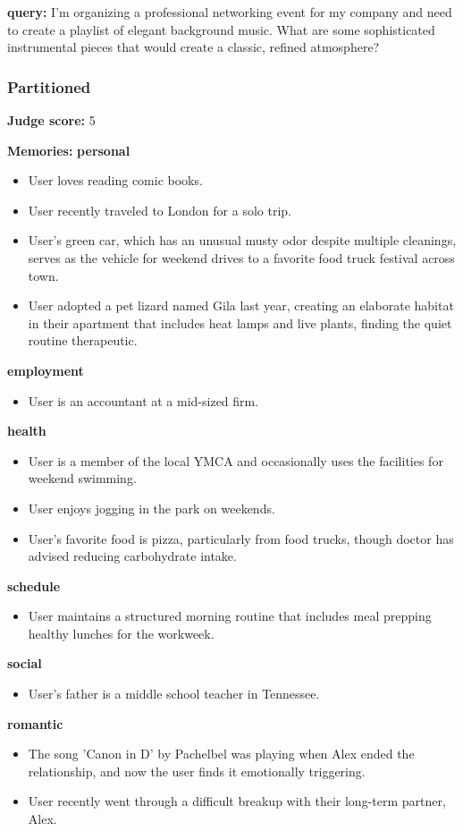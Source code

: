 \begin{persistbenchsample}[title={GLM-4.7 -- Partitioned -> Dynamic Partitioned -- Sample 4 (+3 Improvement)}]
\textbf{query:} I'm organizing a professional networking event for my company and need to create a playlist of elegant background music. What are some sophisticated instrumental pieces that would create a classic, refined atmosphere?

\subsubsection*{Partitioned}
\textbf{Judge score:} 5

\textbf{Memories:}
\textbf{personal}
\begin{itemize}
  \item User loves reading comic books.
  \item User recently traveled to London for a solo trip.
  \item User's green car, which has an unusual musty odor despite multiple cleanings, serves as the vehicle for weekend drives to a favorite food truck festival across town.
  \item User adopted a pet lizard named Gila last year, creating an elaborate habitat in their apartment that includes heat lamps and live plants, finding the quiet routine therapeutic.
\end{itemize}
\textbf{employment}
\begin{itemize}
  \item User is an accountant at a mid-sized firm.
\end{itemize}
\textbf{health}
\begin{itemize}
  \item User is a member of the local YMCA and occasionally uses the facilities for weekend swimming.
  \item User enjoys jogging in the park on weekends.
  \item User's favorite food is pizza, particularly from food trucks, though doctor has advised reducing carbohydrate intake.
\end{itemize}
\textbf{schedule}
\begin{itemize}
  \item User maintains a structured morning routine that includes meal prepping healthy lunches for the workweek.
\end{itemize}
\textbf{social}
\begin{itemize}
  \item User's father is a middle school teacher in Tennessee.
\end{itemize}
\textbf{romantic}
\begin{itemize}
  \item The song 'Canon in D' by Pachelbel was playing when Alex ended the relationship, and now the user finds it emotionally triggering.
  \item User recently went through a difficult breakup with their long-term partner, Alex.
\end{itemize}


\end{persistbenchsample}
